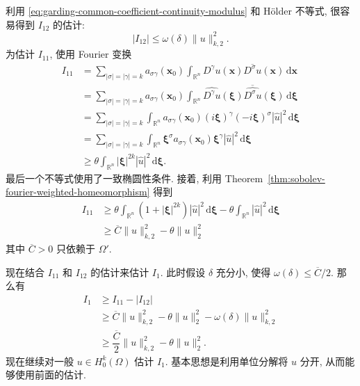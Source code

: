 \begin{Proof}
利用 \eqref{eq:garding-common-coefficient-continuity-modulus} 和 Hölder 不等式, 很容易得到 $I_{12}$ 的估计:
\begin{equation}\label{eq:garding-coefficient-variation-modulus-bound}
|I_{12}|\leq\omega(\delta)\|u\|_{k,2}^2.
\end{equation}
为估计 $I_{11}$, 使用 Fourier 变换\[\begin{aligned}
I_{11}&=\sum_{|\sigma|=|\gamma|=k}a_{\sigma\gamma}(\bm{x}_0)\int_{\mathbb{R}^n}D^\gamma u(\bm{x})\overline{D^\sigma u}(\bm{x})\,\mathrm{d}\bm{x}\\
&=\sum_{|\sigma|=|\gamma|=k}a_{\sigma\gamma}(\bm{x}_0)\int_{\mathbb{R}^n}\widehat{D^\gamma u}(\bm{\xi})\overline{\widehat{D^\sigma u}}(\bm{\xi})\,\mathrm{d}\bm{\xi}\\
&=\sum_{|\sigma|=|\gamma|=k}\int_{\mathbb{R}^n}a_{\sigma\gamma}(\bm{x}_0)(i\bm{\xi})^\gamma(-i\bm{\xi})^\sigma|\widehat u|^2\,\mathrm{d}\bm{\xi}\\
&=\sum_{|\sigma|=|\gamma|=k}\int_{\mathbb{R}^n}\bm{\xi}^\sigma a_{\sigma\gamma}(\bm{x}_0)\bm{\xi}^\gamma|\widehat u|^2\,\mathrm{d}\bm{\xi}\\
&\geq\theta\int_{\mathbb{R}^n}|\bm{\xi}|^{2k}|\widehat u|^2\,\mathrm{d}\bm{\xi}.
\end{aligned}\]最后一个不等式使用了一致椭圆性条件. 接着, 利用 Theorem~\ref{thm:sobolev-fourier-weighted-homeomorphism} 得到\[\begin{aligned}
I_{11}&\geq\theta\int_{\mathbb{R}^n}(1+|\bm{\xi}|^{2k})|\widehat u|^2\,\mathrm{d}\bm{\xi}-\theta\int_{\mathbb{R}^n}|\widehat u|^2\,\mathrm{d}\bm{\xi}\\
&\geq\overline C\|u\|_{k,2}^2-\theta\|u\|_2^2
\end{aligned}\]其中 $\overline C>0$ 只依赖于 $\Omega\prime$.

现在结合 $I_{11}$ 和 $I_{12}$ 的估计来估计 $I_1$. 此时假设 $\delta$ 充分小, 使得 $\omega(\delta)\leq\overline C/2$. 那么有
\begin{equation}\label{eq:garding-ball-local-principal-part-bound}
\begin{aligned}
I_1&\geq I_{11}-|I_{12}|\\
&\geq\overline C\|u\|_{k,2}^2-\theta\|u\|_2^2-\omega(\delta)\|u\|_{k,2}^2\\
&\geq\dfrac{\overline C}{2}\|u\|_{k,2}^2-\theta\|u\|_2^2.
\end{aligned}
\end{equation}
现在继续对一般 $u\in H_0^k(\Omega)$ 估计 $I_1$. 基本思想是利用单位分解将 $u$ 分开, 从而能够使用前面的估计.


\end{Proof}
